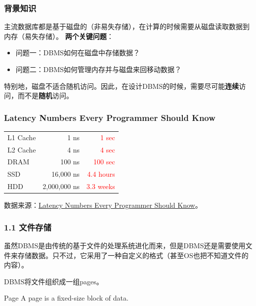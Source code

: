 \documentclass[aspectratio=169, 14pt]{beamer}
\begin{document}
\begin{frame}
    \frametitle{背景知识}
主流数据库都是基于\alert{磁盘的}（非易失存储），在计算的时候需要从磁盘读取数据到\alert{内存}（易失存储）。
\noindent\makebox[\linewidth]{\rule{\paperwidth}{0.4pt}}
\textbf{ 两个关键问题}：

\begin{itemize}
    \item 问题一：DBMS如何在磁盘中存储数据？
    \item 问题二：DBMS如何管理内存并与磁盘来回移动数据？
\end{itemize}

特别地，磁盘不适合随机访问。因此，在设计DBMS的时候，需要尽可能\textbf{连续}访问，而不是\textbf{随机}访问。
\end{frame}

\begin{frame}
    \frametitle{Latency Numbers Every Programmer Should Know}

    \begin{table}
        \begin{tabular}{lrr}
          \toprule
          L1 Cache & 1 ns & \textcolor{red}{1 sec} \\
          L2 Cache & 4 ns & \textcolor{red}{4 sec} \\
          DRAM & 100 ns & \textcolor{red}{100 sec} \\
          SSD & 16,000 ns & \textcolor{red}{4.4 hours} \\
          HDD & 2,000,000 ns & \textcolor{red}{3.3 weeks} \\
          \bottomrule
        \end{tabular}
    \end{table}
    数据来源：\href{https://colin-scott.github.io/personal_website/research/interactive_latency.html}{Latency Numbers Every Programmer Should Know}。
\end{frame}

\begin{frame}
    \frametitle{1.1 文件存储}
虽然DBMS是由传统的\alert{基于文件的处理系统}进化而来，但是DBMS还是需要使用文件来存储数据。只不过，它采用了一种自定义的格式（甚至OS也把不知道文件的内容）。

DBMS将文件组织成一组\alert{pages}。

\begin{exampleblock}{Page}
A page is a fixed-size block of data.    
\end{exampleblock}

\end{frame}
\end{document}
